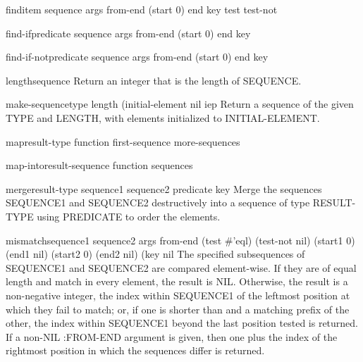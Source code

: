 \begin{function}{find}{item sequence \rest args \key from-end (start 0) end key test test-not}{}
  
\end{function}

\begin{function}{find-if}{predicate sequence \rest args \key from-end (start 0) end key}{}
  
\end{function}

\begin{function}{find-if-not}{predicate sequence \rest args \key from-end (start 0) end key}{}
  
\end{function}

\begin{function}{length}{sequence}{}
  Return an integer that is the length of SEQUENCE.
\end{function}

\begin{function}{make-sequence}{type length \key (initial-element nil iep}{}
  Return a sequence of the given TYPE and LENGTH, with elements initialized
  to INITIAL-ELEMENT.
\end{function}

\begin{function}{map}{result-type function first-sequence \rest more-sequences}{}
  
\end{function}

\begin{function}{map-into}{result-sequence function \rest sequences}{}
  
\end{function}

\begin{function}{merge}{result-type sequence1 sequence2 predicate \key key}{}
  Merge the sequences SEQUENCE1 and SEQUENCE2 destructively into a
   sequence of type RESULT-TYPE using PREDICATE to order the elements.
\end{function}

\begin{function}{mismatch}{sequence1 sequence2 \rest args \key from-end (test #'eql) (test-not nil)
 (start1 0) (end1 nil) (start2 0) (end2 nil) (key nil}{}
  The specified subsequences of SEQUENCE1 and SEQUENCE2 are compared
   element-wise. If they are of equal length and match in every element, the
   result is NIL. Otherwise, the result is a non-negative integer, the index
   within SEQUENCE1 of the leftmost position at which they fail to match; or,
   if one is shorter than and a matching prefix of the other, the index within
   SEQUENCE1 beyond the last position tested is returned. If a non-NIL
   :FROM-END argument is given, then one plus the index of the rightmost
   position in which the sequences differ is returned.
\end{function}

